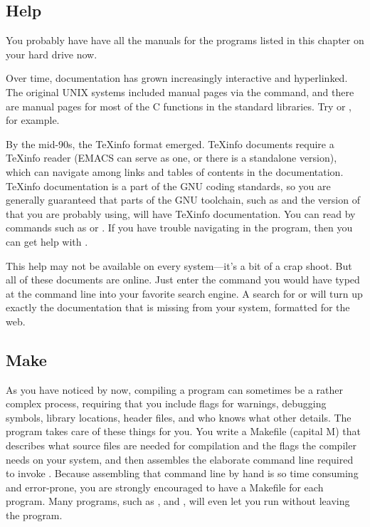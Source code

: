 \subsection{Help} 
You probably have have all the manuals for the programs listed in this
chapter on your hard drive now. 

Over time, documentation has grown increasingly interactive and
hyperlinked. The original UNIX systems included manual pages via the
 command, and there are manual pages for most of the C functions
in the standard libraries. Try  or ,
for example.

By the mid-90s, the \TeX info format emerged. \TeX info documents
require a \TeX info reader (EMACS can serve as one, or there is a
standalone version), which can navigate among links and tables of
contents in the documentation.
\TeX info documentation is a part of the GNU coding standards, so you
are generally guaranteed that parts of the GNU toolchain, such as
 and the version of  that you are probably using, will
have \TeX info documentation.
You can read by commands such as  or . If
you have trouble navigating in the  program, then you can
get help with .


This help may not be available on every system---it's a bit of
a crap shoot. But all of these documents are online. Just enter the
command you would have typed at the command line into your favorite
search engine. A search for  or  will
turn up exactly the documentation that is missing from your system,
formatted for the web.

\subsection{Make} \label{make} 
As you have noticed by now, compiling a program can sometimes be a
rather complex process, requiring that you include flags for warnings,
debugging symbols, library locations, header files, and who knows what
other details.  The  program takes care of these things for
you. You write a Makefile (capital M) that describes what source files are
needed for compilation and the flags the compiler needs on your system, and then 
 assembles the elaborate command line required to invoke
. Because assembling that command line by hand is so time
consuming and error-prone, you are strongly encouraged to have a Makefile
for each program.  Many programs, such as ,  and
, will even let you run  without leaving the program.

